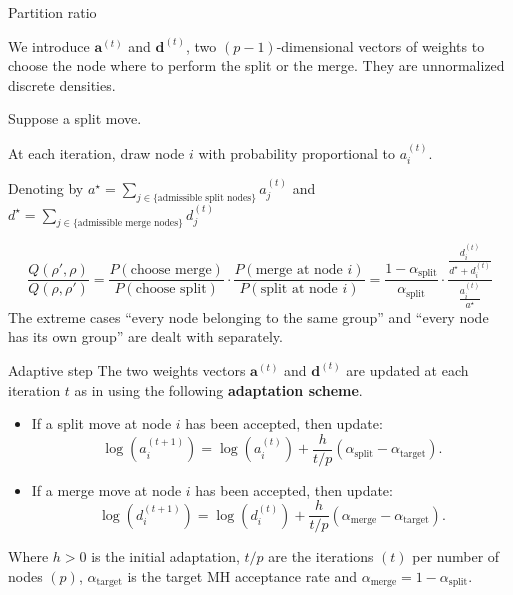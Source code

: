 \begin{frame}{Partition ratio}

We introduce $\bm{a}^{(t)}$ and $\bm{d}^{(t)}$, two $(p-1)$-dimensional vectors of \alert{weights} to choose the node where to perform the split or the merge. They are unnormalized discrete densities.

\pause

Suppose a split move.

\pause

At each iteration, \alert{draw} node $i$ with probability proportional to $a_{i}^{(t)}$.

\pause

Denoting by $a^{\star} = \sum_{j\in \{\text{admissible split nodes}\}}{a_{j}^{(t)}}$ and $d^{\star} = \sum_{j\in \{\text{admissible merge nodes}\}}{d_{j}^{(t)}}$

\pause

\[
    \frac{Q(\rho',\rho)}{Q(\rho,\rho')}
    =
    \frac{P(\text{choose merge})}{P(\text{choose split})}
    \cdot 
    \frac{P(\text{merge at node $i$})}{P(\text{split at node $i$})}
    =
    \frac{1-\alpha_{\text{split}}}{\alpha_{\text{split}}}
    \cdot
    \frac{\frac{d_{i}^{(t)}}{d^{\star}+d_{i}^{(t)}}}{\frac{a_{i}^{(t)}}{a^{\star}}}
\]
The extreme cases ``every node belonging to the same group'' and ``every node has its own group'' are dealt with separately.

\end{frame}

\begin{frame}{Adaptive step}
    The two weights vectors $\bm{a}^{(t)}$ and $\bm{d}^{(t)}$ are updated at each iteration $t$ as in \cite{bensonAdaptiveMCMCMultiple2018} using the following 
    \textbf{adaptation scheme}.

    \begin{itemize}
        \item If a \alert{split} move at node $i$ has been accepted, then update:
		\[
		\log (a_i^{(t+1)})=\log (a_i^{(t)})+\frac{h}{t/p}(\alpha_{\text{split}}-\alpha_{\text{target}}) .
		\]
        \item If a \alert{merge} move at node $i$ has been accepted, then update:
		\[
		\log (d_i^{(t+1)})=\log (d_i^{(t)})+\frac{h}{t/p}(\alpha_{\text{merge}}-\alpha_{\text{target}}) .
		\]
        \end{itemize}
Where $h>0$ is the initial adaptation, $t/p$ are the iterations $(t)$ per number of nodes $(p)$, $\alpha_{\text{target}}$ is the target MH acceptance rate and $\alpha_{\text{merge}} = 1 - \alpha_{\text{split}}$.

\end{frame}

